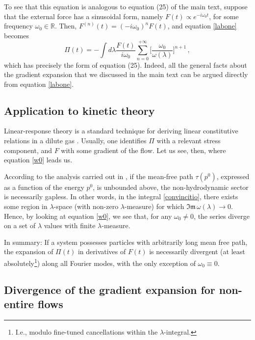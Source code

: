 \documentclass[a4paper, amsfonts, amssymb, amsmath, reprint, showkeys, twoside,notitlepage]{revtex4-2}
\begin{document}
To see that this equation is analogous to equation (25) of the main text, suppose that the external force has a sinusoidal form, namely $F(t)\propto e^{-i\omega_0 t}$, for some frequency $\omega_0\in \mathbb{R}$. Then, $F^{(n)}(t)=(-i\omega_0)^n F(t)$, and equation \eqref{labone} becomes
\begin{equation}\label{w0}
\Pi(t)=- \int d\lambda \dfrac{F(t)}{i\omega_0} \sum_{n=0}^{+\infty} \bigg[\dfrac{\omega_0}{\omega(\lambda)} \bigg]^{n+1} \, ,
\end{equation}
which has precisely the form of equation (25). Indeed, all the general facts about the gradient expansion that we discussed in the main text can be argued directly from equation \eqref{labone}.

\newpage

\subsection{Application to kinetic theory}

Linear-response theory is a standard technique for deriving linear constitutive relations in a dilute gas \cite{Denicol_Relaxation_2011,GavassinoBurgers2023,WagnerGavassino2023jgq,Rocha:2024cge}. Usually, one identifies $\Pi$ with a relevant stress component, and $F$ with some gradient of the flow. Let us see, then, where equation \eqref{w0} leads us. 

According to the analysis carried out in \cite{GavassinoGapless2024rck}, if the mean-free path $\tau(p^0)$, expressed as a function of the energy $p^0$, is unbounded above, the non-hydrodynamic sector is necessarily gapless. In other words, in the integral \eqref{convincitio}, there exists some region in $\lambda$-space (with non-zero $\lambda$-measure) for which $\mathfrak{Im} \, \omega(\lambda)\rightarrow 0$. Hence, by looking at equation \eqref{w0}, we see that, for any $\omega_0 \neq 0$, the series diverge on a set of $\lambda$ values with finite $\lambda$-measure.

In summary: If a system possesses particles with arbitrarily long mean free path, the expansion of $\Pi(t)$ in derivatives of $F(t)$ is necessarily divergent (at least absolutely\footnote{I.e., modulo fine-tuned cancellations within the $\lambda$-integral.}) along all Fourier modes, with the only exception of $\omega_0 \equiv 0$.  



\subsection{Divergence of the gradient expansion for non-entire flows}
\end{document}

